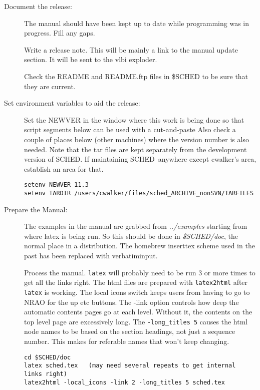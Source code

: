 \documentclass{report}
\newcommand{\sched}{{\sc SCHED}}
\newcommand{\schedb}{{\sc SCHED~}}
\begin{document}
\begin{description}
\item [Document the release:]

The manual should have been kept up to date while programming was in
progress.  Fill any gaps.

Write a release note.  This will be mainly a link to the manual
update section.  It will be sent to the vlbi exploder.

Check the README and README.ftp files in \$SCHED to be sure that
they are current.

      
\item [Set environment variables to aid the release:]

Set the NEWVER in the window where this work is being done so
that script segments below can be used with a cut-and-paste
Also check a couple of places below (other machines) where the
version number is also needed.  Note that the tar files are 
kept separately from the development version of \sched.  
If maintaining \schedb anywhere except cwalker's area, establish an
area for that.

\begin{verbatim}
setenv NEWVER 11.3
setenv TARDIR /users/cwalker/files/sched_ARCHIVE_nonSVN/TARFILES
\end{verbatim}

\item [Prepare the Manual:]

The examples in the manual are grabbed from {\sl ../examples} starting
from where latex is being run.  So this should be done in {\sl
\$SCHED/doc}, the normal place in a distribution.  The homebrew
inserttex scheme used in the past has been replaced with
verbatiminput.

Process the manual.  {\tt latex} will probably need to be run 3 or
more times to get all the links right.  The html files are prepared
with {\tt latex2html} after {\tt latex} is working.  The local icons
switch keeps users from having to go to NRAO for the up etc buttons.
The -link option controls how deep the automatic contents pages go at
each level.  Without it, the contents on the top level page are
excessively long.  The {\tt -long\_titles 5} causes the html node names to be
based on the section headings, not just a sequence number.  This makes
for referable names that won't keep changing.
     
\begin{verbatim}
cd $SCHED/doc
latex sched.tex   (may need several repeats to get internal links right)
latex2html -local_icons -link 2 -long_titles 5 sched.tex
\end{verbatim}


\end{description}
\end{document}
